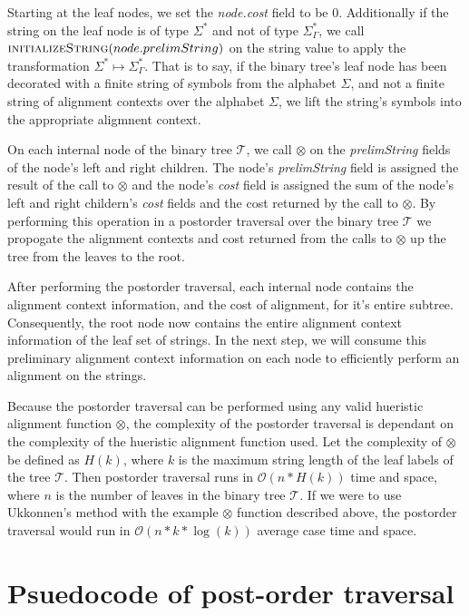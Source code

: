 \documentclass[11pt]{article}
\begin{document}
Starting at the leaf nodes, we set the \textit{node.cost} field to be $0$.
Additionally if the string on the leaf node is of type $\Sigma^{*}$ and not of type $\Sigma^{*}_{\Gamma}$, we call $\Call{initializeString}{node.prelimString}$ on the string value to apply the transformation $\Sigma^{*} \mapsto \Sigma^{*}_{\Gamma}$.
That is to say, if the binary tree's leaf node has been decorated with a finite string of symbols from the alphabet $\Sigma$, and not a finite string of alignment contexts over the alphabet $\Sigma$, we lift the string's symbols into the appropriate aligmnent context.

On each internal node of the binary tree $\mathcal{T}$, we call $\otimes$ on the \textit{prelimString} fields of the node's left and right children.
The node's \textit{prelimString} field is assigned the result of the call to $\otimes$ and the node's  \textit{cost} field is assigned the sum of the node's left and right childern's \textit{cost} fields and the cost returned by the call to $\otimes$.
By performing this operation in a postorder traversal over the binary tree $\mathcal{T}$ we propogate the alignment contexts and cost returned from the calls to $\otimes$ up the tree from the leaves to the root.

After performing the postorder traversal, each internal node contains the alignment context information, and the cost of alignment, for it's entire subtree.
Consequently, the root node now contains the entire alignment context information of the leaf set of strings.
In the next step, we will consume this preliminary alignment context information on each node to efficiently perform an alignment on the strings.

Because the postorder traversal can be performed using any valid hueristic alignment function $\otimes$, the complexity of the postorder traversal is dependant on the complexity of the hueristic alignment function used. Let the complexity of $\otimes$ be defined as $H\left(k\right)$, where $k$ is the maximum string length of the leaf labels of the tree $\mathcal{T}$. Then postorder traversal runs in $\mathcal{O}(n * H(k))$ time and space, where $n$ is the number of leaves in the binary tree $\mathcal{T}$. If we were to use Ukkonnen's method with the example $\otimes$ function described above, the postorder traversal would run in $\mathcal{O}\left( n * k * \log \left( k \right) \right)$ average case time and space.

\section{Psuedocode of post-order traversal}
\end{document}
